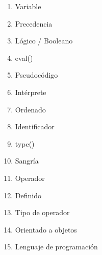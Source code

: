 
\begin{multicols}{4}
  \begin{enumerate}
    \item Variable
    \item Precedencia
    \item Lógico / Booleano
    \item eval()
    \item Pseudocódigo
    \item Intérprete
    \item Ordenado
    \item Identificador
    \item type()
    \item Sangría
    \item Operador
    \item Definido
    \item Tipo de operador
    \item Orientado a objetos
    \item Lenguaje de programación
  \end{enumerate}
\end{multicols}
